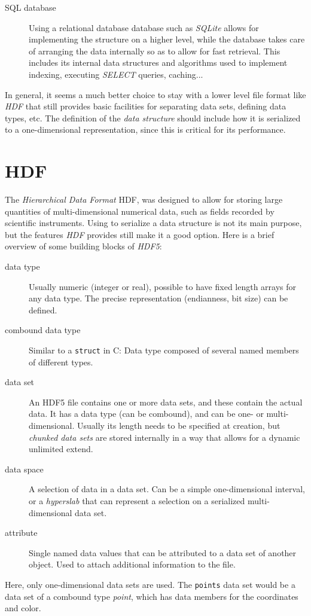 \documentclass[a4paper,10pt,abstracton,notitlepage]{scrreprt}
\begin{document}
\begin{description}
\item[SQL database] Using a relational database database such as \emph{SQLite} allows for implementing the structure on a higher level, while the database takes care of arranging the data internally so as to allow for fast retrieval. This includes its internal data structures and algorithms used to implement indexing, executing \emph{SELECT} queries, caching...
\end{description}

In general, it seems a much better choice to stay with a lower level file format like \emph{HDF} that still provides basic facilities for separating data sets, defining data types, etc. The definition of the \emph{data structure} should include how it is serialized to a one-dimensional representation, since this is critical for its performance.

\section{HDF}
The \emph{Hierarchical Data Format} HDF, was designed to allow for storing large quantities of multi-dimensional numerical data, such as fields recorded by scientific instruments. Using to serialize a data structure is not its main purpose, but the features \emph{HDF} provides still make it a good option. Here is a brief overview of some building blocks of \emph{HDF5}:
\begin{description}
\item[data type] Usually numeric (integer or real), possible to have fixed length arrays for any data type. The precise representation (endianness, bit size) can be defined.
\item[combound data type] Similar to a \texttt{struct} in C: Data type composed of several named members of different types.
\item[data set] An HDF5 file contains one or more data sets, and these contain the actual data. It has a data type (can be combound), and can be one- or multi-dimensional. Usually its length needs to be specified at creation, but \emph{chunked data sets} are stored internally in a way that allows for a dynamic unlimited extend.
\item[data space] A selection of data in a data set. Can be a simple one-dimensional interval, or a \emph{hyperslab} that can represent a selection on a serialized multi-dimensional data set.
\item[attribute] Single named data values that can be attributed to a data set of another object. Used to attach additional information to the file.
\end{description}
Here, only one-dimensional data sets are used. The \texttt{points} data set would be a data set of a combound type \emph{point}, which has data members for the coordinates and color.
\end{document}
